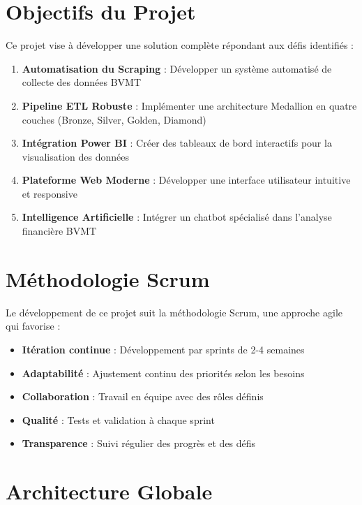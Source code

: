 \section*{Objectifs du Projet}

Ce projet vise à développer une solution complète répondant aux défis identifiés :

\begin{enumerate}
    \item \textbf{Automatisation du Scraping} : Développer un système automatisé de collecte des données BVMT
    \item \textbf{Pipeline ETL Robuste} : Implémenter une architecture Medallion en quatre couches (Bronze, Silver, Golden, Diamond)
    \item \textbf{Intégration Power BI} : Créer des tableaux de bord interactifs pour la visualisation des données
    \item \textbf{Plateforme Web Moderne} : Développer une interface utilisateur intuitive et responsive
    \item \textbf{Intelligence Artificielle} : Intégrer un chatbot spécialisé dans l'analyse financière BVMT
\end{enumerate}

\section*{Méthodologie Scrum}

Le développement de ce projet suit la méthodologie Scrum, une approche agile qui favorise :

\begin{itemize}
    \item \textbf{Itération continue} : Développement par sprints de 2-4 semaines
    \item \textbf{Adaptabilité} : Ajustement continu des priorités selon les besoins
    \item \textbf{Collaboration} : Travail en équipe avec des rôles définis
    \item \textbf{Qualité} : Tests et validation à chaque sprint
    \item \textbf{Transparence} : Suivi régulier des progrès et des défis
\end{itemize}

\section*{Architecture Globale}


